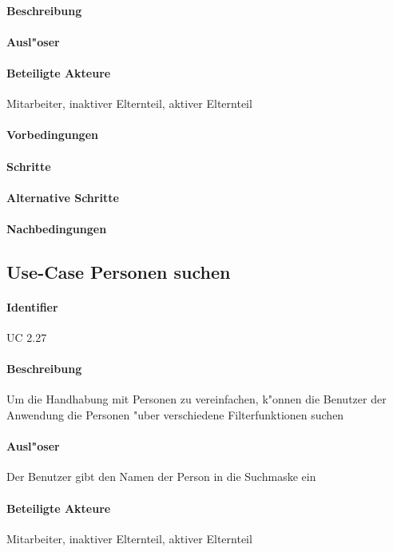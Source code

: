   \paragraph{Beschreibung}
  \paragraph{Ausl"oser}
  \paragraph{Beteiligte Akteure}   \leavevmode \newline
    Mitarbeiter, inaktiver Elternteil, aktiver Elternteil
  \paragraph{Vorbedingungen}
  \paragraph{Schritte}
  \paragraph{Alternative Schritte}
  \paragraph{Nachbedingungen}

  
  \newpage
 \subsection{Use-Case Personen suchen}
  \paragraph{Identifier}
  UC 2.27
  \paragraph{Beschreibung}
  Um die Handhabung mit Personen zu vereinfachen, k"onnen die Benutzer der Anwendung die Personen "uber verschiedene Filterfunktionen suchen
  \paragraph{Ausl"oser}
  Der Benutzer gibt den Namen der Person in die Suchmaske ein
  \paragraph{Beteiligte Akteure}   \leavevmode \newline
    Mitarbeiter, inaktiver Elternteil, aktiver Elternteil
